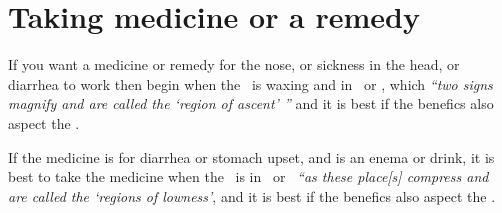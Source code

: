 \section{Taking medicine or a remedy}
	If you want a medicine or remedy for the nose, or sickness in the head, or diarrhea to work then begin when the \Moon\, is waxing and in \Aries\, or \Taurus, which \textsl{``two signs magnify and are called the `region of ascent' ''} and it is best if the benefics also aspect the \Moon.
	
	If the medicine is for diarrhea or stomach upset, and is an enema or drink, it is best to take the medicine when the \Moon\, is in \Libra\, or \Scorpio\, \textsl{``as these place[s] compress and are called the `regions of lowness'}, and it is best if the benefics also aspect the \Moon.
	